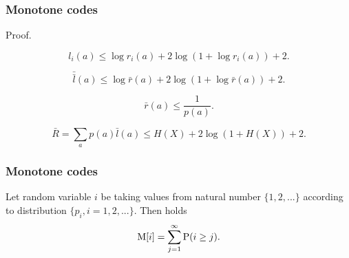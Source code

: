 \documentclass[14pt]{beamer}
\begin{document}
\begin{frame}
\frametitle{Monotone codes}
Proof.
\begin{itemize}    
\small{    

    \item
    \begin{equation}
    \label{eq4_8} l_i (a) \le \log r_i (a) + 2\log (1 + \log r_i (a)) + 2.
    \end{equation}
    
    
    \item
    \begin{equation}
    \label{eq4_9} \bar {\bar {l}}(a) \le \log \bar {r}(a) + 2\log (1 +
    \log \bar {r}(a)) + 2.
    \end{equation}
    
    \item
    \begin{equation}
    \label{eq4_10} \bar {r}(a) \le \frac{1}{p(a)}.
    \end{equation}
    
    \item 
    \[
    \bar {R} = \sum\limits_a {p(a)\bar {l}(a) \le H(X) + 2\log \left( {1 + H(X)}
    \right) + 2} .
    \]
}
\end{itemize}
\end{frame}



\begin{frame}
\frametitle{Monotone codes}

    \begin{lemma} \label{lem4_1} Let random variable $i$ be taking values from natural number $\{1,2,...\}$ according to distribution $\{p_i ,i = 1,2,...\}$. Then holds
    \begin{equation}
    \label{eq4_11} {\rm M}[i] = \sum\limits_{j = 1}^\infty {{\rm P}(i
    \ge j)} .
    \end{equation}
    \end{lemma}

\end{frame}
\end{document}

